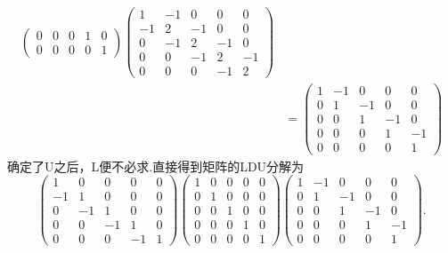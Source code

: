 ﻿\documentclass{book} \usepackage{exsheets} \usepackage{xeCJK}
\begin{document}
\begin{solution}
\begin{align*}
\begin{pmatrix}
                                             0&0&0&1&0\\
                                             0&0&0&0&1
                                           \end{pmatrix}
                                                      \begin{pmatrix}
                                                        1&-1&0&0&0\\
                                                        -1&2&-1&0&0\\
                                                        0&-1&2&-1&0\\
                                                        0&0&-1&2&-1\\
                                                        0&0&0&-1&2
                                                      \end{pmatrix}\\&=
                                                                       \begin{pmatrix}
                                                                         1&-1&0&0&0\\
                                                                         0&1&-1&0&0\\
                                                                         0&0&1&-1&0\\
                                                                         0&0&0&1&-1\\
                                                                         0&0&0&0&1
                                                                       \end{pmatrix}
\end{align*}
确定了U之后，L便不必求.直接得到矩阵的LDU分解为
$$
\begin{pmatrix}
  1&0&0&0&0\\
  -1&1&0&0&0\\
  0&-1&1&0&0\\
  0&0&-1&1&0\\
  0&0&0&-1&1
\end{pmatrix}
\begin{pmatrix}
  1&0&0&0&0\\
  0&1&0&0&0\\
  0&0&1&0&0\\
  0&0&0&1&0\\
  0&0&0&0&1
\end{pmatrix}
\begin{pmatrix}
  1&-1&0&0&0\\
  0&1&-1&0&0\\
  0&0&1&-1&0\\
  0&0&0&1&-1\\
  0&0&0&0&1
\end{pmatrix}.
$$
\end{solution}
\end{document}
